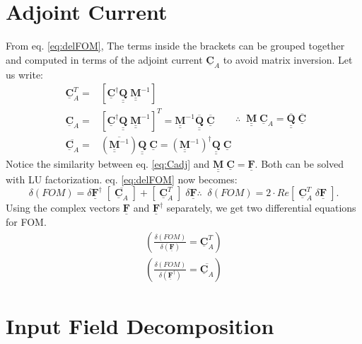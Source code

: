 \documentclass[11pt,letterpaper]{article}
\newcommand{\Qmat}{\underline{\underline{\mathbf{Q}}}}
\newcommand{\Mmat}{\underline{\underline{\mathbf{M}}}}
\newcommand{\Cvec}{\underline{\mathbf{C}}}
\newcommand{\Fvec}{\underline{\mathbf{F}}}
\begin{document}
\begin{multicols}{2}
\section{\large{Adjoint Current}}
From eq. \ref{eq:delFOM}, 
The terms inside the brackets can be grouped together and computed in terms of the adjoint current $\Cvec_A$ to avoid matrix inversion. Let us write:
\begin{subequations}
\begin{align}
\Cvec_A^T =& [\Cvec^{\dagger} \Qmat\;\Mmat^{-1}]\\
\Cvec_A =& [\Cvec^{\dagger} \Qmat\;\Mmat^{-1}]^T = \Mmat^{-1} \overline{\Qmat} \; \overline{\Cvec}  \\
\overline{\Cvec_A}=& (\overline{\Mmat^{-1}})\Qmat\;\Cvec = (\Mmat^{-1})^{\dagger}\Qmat\;\Cvec
\end{align}
\begin{equation}
\therefore\;\;\boxed{\Mmat \; \Cvec_A = \overline{\Qmat} \;\overline{\Cvec}}\label{eq:Cadj}
\end{equation}
\end{subequations}
Notice the similarity between eq. \ref{eq:Cadj} and $\Mmat \; \Cvec = \Fvec$. Both can be solved with LU factorization. eq. \ref{eq:delFOM} now becomes:
\begin{subequations}
\begin{equation}
\delta(FOM)=\delta\Fvec^{\dagger}\; [\;\overline{\Cvec_A}\;] + [\;\Cvec_A^T\;] \; \delta\Fvec
\end{equation}
\begin{equation}\label{eq:delFOM2}
\therefore \;\; \boxed{\delta(FOM) = 2 \cdot Re\left[\; \Cvec_A^T \;\delta\Fvec\;\right].}
\end{equation}
\end{subequations}
Using the complex vectors $\Fvec$ and $\Fvec^{\dagger}$ separately, we get two differential equations for FOM.
\begin{subequations}
\begin{align}
	\left( \frac{\delta (FOM)}{\delta(\Fvec)} = \Cvec_A^T \right) \label{eq:gradFOMgradF}\\
	\left( \frac{\delta (FOM)}{\delta(\Fvec^{\dagger})}= \overline{\Cvec_A}\right)\label{eq:gradFOMgradFconj}
\end{align}
\end{subequations}
\section{\large{Input Field Decomposition}}

\end{multicols}
\end{document}
